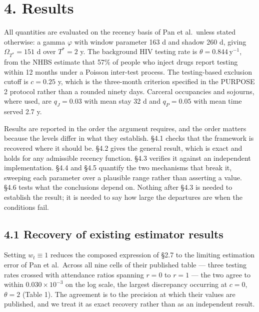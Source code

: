 \section{4. Results}

All quantities are evaluated on the recency basis of Pan et al.~unless stated otherwise: a gamma \(\varphi\) with window parameter 163 d and shadow 260 d, giving \(\Omega_{T^*}=151\) d over \(T^*=2\) y. The background HIV testing rate is \(\theta=0.844\,\mathrm{y}^{-1}\), from the NHBS estimate that 57\% of people who inject drugs report testing within 12 months under a Poisson inter-test process. The testing-based exclusion cutoff is \(c=0.25\) y, which is the three-month criterion specified in the PURPOSE 2 protocol rather than a rounded ninety days. Carceral occupancies and sojourns, where used, are \(q_J=0.03\) with mean stay 32 d and \(q_P=0.05\) with mean time served 2.7 y.

Results are reported in the order the argument requires, and the order matters because the levels differ in what they establish. §4.1 checks that the framework is recovered where it should be. §4.2 gives the general result, which is exact and holds for any admissible recency function. §4.3 verifies it against an independent implementation. §4.4 and §4.5 quantify the two mechanisms that break it, sweeping each parameter over a plausible range rather than asserting a value. §4.6 tests what the conclusions depend on. Nothing after §4.3 is needed to establish the result; it is needed to say how large the departures are when the conditions fail.

\subsection{4.1 Recovery of existing estimator results}

Setting \(w_t\equiv1\) reduces the composed expression of §2.7 to the limiting estimation error of Pan et al.~Across all nine cells of their published table --- three testing rates crossed with attendance ratios spanning \(r=0\) to \(r=1\) --- the two agree to within \(0.030\times10^{-3}\) on the log scale, the largest discrepancy occurring at \(c=0\), \(\theta=2\) (Table 1). The agreement is to the precision at which their values are published, and we treat it as exact recovery rather than as an independent result.

